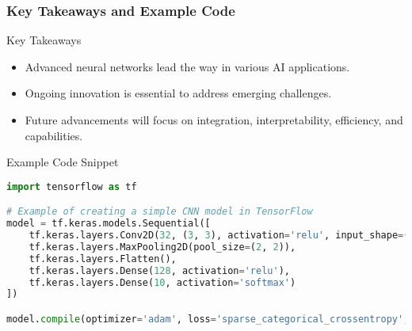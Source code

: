 \documentclass{beamer}
\begin{document}
\begin{frame}[fragile]
    \frametitle{Key Takeaways and Example Code}
    
    \begin{block}{Key Takeaways}
        \begin{itemize}
            \item Advanced neural networks lead the way in various AI applications.
            \item Ongoing innovation is essential to address emerging challenges.
            \item Future advancements will focus on integration, interpretability, efficiency, and capabilities.
        \end{itemize}
    \end{block}

    \begin{block}{Example Code Snippet}
        \begin{lstlisting}[language=Python]
import tensorflow as tf

# Example of creating a simple CNN model in TensorFlow
model = tf.keras.models.Sequential([
    tf.keras.layers.Conv2D(32, (3, 3), activation='relu', input_shape=(64, 64, 3)),
    tf.keras.layers.MaxPooling2D(pool_size=(2, 2)),
    tf.keras.layers.Flatten(),
    tf.keras.layers.Dense(128, activation='relu'),
    tf.keras.layers.Dense(10, activation='softmax')
])

model.compile(optimizer='adam', loss='sparse_categorical_crossentropy', metrics=['accuracy'])
        \end{lstlisting}
    \end{block}
\end{frame}
\end{document}
